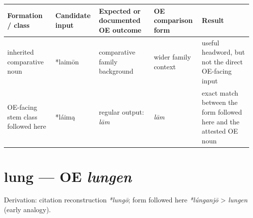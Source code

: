 \documentclass[
  british,
  a4paper,
  openany]{book}
\newcounter{none} %
\providecommand{\texorpdfstring}[2]{#1}
\begin{document}
{\def\LTcaptype{none} %
\begin{longtable}[]{@{}
  >{\raggedright\arraybackslash}p{}
  >{\raggedright\arraybackslash}p{}
  >{\raggedright\arraybackslash}p{}
  >{\raggedright\arraybackslash}p{}
  >{\raggedright\arraybackslash}p{}@{}}
\toprule\noalign{}
\begin{minipage}[b]{\linewidth}\raggedright
Formation / class
\end{minipage} & \begin{minipage}[b]{\linewidth}\raggedright
Candidate input
\end{minipage} & \begin{minipage}[b]{\linewidth}\raggedright
Expected or documented OE outcome
\end{minipage} & \begin{minipage}[b]{\linewidth}\raggedright
OE comparison form
\end{minipage} & \begin{minipage}[b]{\linewidth}\raggedright
Result
\end{minipage} \\
\midrule\noalign{}
\endhead
\bottomrule\noalign{}
\endlastfoot
inherited comparative noun & *laimōn & comparative family background &
wider family context & useful headword, but not the direct OE-facing
input \\
OE-facing stem class followed here & *láimą & regular output: \emph{lām}
& \emph{lām} & exact match between the form followed here and the
attested OE noun \\
\end{longtable}
}

\section{\texorpdfstring{lung --- OE
\emph{lungen}}{lung --- OE lungen}}\label{lung-oe-lungen}


Derivation: citation reconstruction \emph{*lungō}; form followed here
\emph{*lúnganjō} \textgreater{} \emph{lungen} (early analogy).
\end{document}
